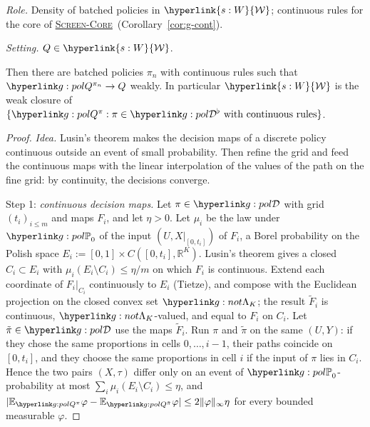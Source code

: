 \documentclass[11pt]{article}
\DeclareRobustCommand{\sy}[2]{{\hyperlink{#1}{#2}}}
\newcommand{\R}{\mathbb{R}}
\newcommand{\E}{\mathbb{E}}
\newcommand{\1}{\mathbf{1}}
\newcommand{\Wc}{\sy{s:W}{\mathcal W}}
\newcommand{\SC}{\sy{alg:sc}{\textsc{Screen-Core}}}
\begin{document}
\begin{lemma}\label{lem:g-dense}
\textit{Role.} Density of batched policies in $\Wc$; continuous rules for the core of \SC\ (Corollary~\ref{cor:g-cont}).

\noindent\textit{Setting.} $Q\in\Wc$.

\noindent Then there are batched policies $\pi_n$ with continuous rules such that $\gQp{\pi_n}\to Q$ weakly. In particular $\Wc$ is the weak closure of
$\{\gQp\pi:\pi\in\gBc\text{ with continuous rules}\}$.
\end{lemma}
\begin{proof}
\textit{Idea.} Lusin's theorem makes the decision maps of a discrete policy continuous outside an event of small probability. Then refine the grid and feed the
continuous maps with the linear interpolation of the values of the path on the fine grid: by continuity, the decisions converge.

Step 1: \emph{continuous decision maps.} Let $\pi\in\gDc$ with grid $(t_i)_{i\le m}$ and maps $F_i$, and let $\eta>0$. Let $\mu_i$ be the law under $\gPh_0$ of the input
$(U,X|_{[0,t_i]})$ of $F_i$, a Borel probability on the Polish space $E_i:=[0,1]\times C([0,t_i],\R^K)$. Lusin's theorem \citep[Thm~17.12]{Kec95} gives a closed $C_i\subset E_i$
with $\mu_i(E_i\setminus C_i)\le\eta/m$ on which $F_i$ is continuous. Extend each coordinate of $F_i|_{C_i}$ continuously to $E_i$ (Tietze), and compose with the Euclidean
projection on the closed convex set $\gSmp$; the result $\tilde F_i$ is continuous, $\gSmp$-valued, and equal to $F_i$ on $C_i$. Let $\tilde\pi\in\gDc$ use the maps
$\tilde F_i$. Run $\pi$ and $\tilde\pi$ on the same $(U,Y)$: if they chose the same proportions in cells $0,\dots,i-1$, their paths coincide on $[0,t_i]$, and they choose
the same proportions in cell $i$ if the input of $\pi$ lies in $C_i$. Hence the two pairs $(X,\tau)$ differ only on an event of $\gPh_0$-probability at most
$\sum_i\mu_i(E_i\setminus C_i)\le\eta$, and $|\E_{\gQp\pi}\varphi-\E_{\gQp{\tilde\pi}}\varphi|\le2\|\varphi\|_\infty\eta$ for every bounded measurable $\varphi$.


\end{proof}
\end{document}
